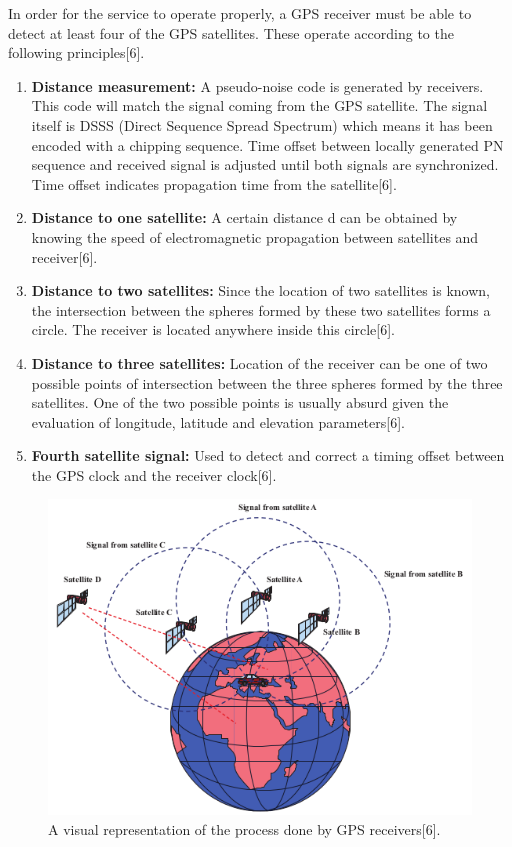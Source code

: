 \documentclass[conference]{IEEEtran}
\begin{document}
In order for the service to operate properly, a GPS receiver must be able to detect at least four of the GPS satellites. These operate according to the following principles[6].

\begin{enumerate}
    \item \textbf{Distance measurement:} A pseudo-noise code is generated by receivers. This code will match the signal coming from the GPS satellite. The signal itself is DSSS (Direct Sequence Spread Spectrum) which means it has been encoded with a chipping sequence. Time offset between locally generated PN sequence and received signal is adjusted until both signals are synchronized. Time offset indicates propagation time from the satellite[6].
    
    \item \textbf{Distance to one satellite:} A certain distance d can be obtained by knowing the speed of electromagnetic propagation between satellites and receiver[6]. 
    
    \item \textbf{Distance to two satellites:} Since the location of two satellites is known, the intersection between the spheres formed by these two satellites forms a circle. The receiver is located anywhere inside this circle[6].
    
    \item \textbf{Distance to three satellites:} Location of the receiver can be one of two possible points of intersection between the three spheres formed by the three satellites. One of the two possible points is usually absurd given the evaluation of longitude, latitude and elevation parameters[6].
    
    \item \textbf{Fourth satellite signal:} Used to detect and correct a timing offset between the GPS clock and the receiver clock[6].
    
\end{enumerate}

\begin{figure}[h!]
    \centering
    \includegraphics[width=\columnwidth]{img1.png}
    \caption{A visual representation of the process done by GPS receivers[6].}
\end{figure}
\end{document}
